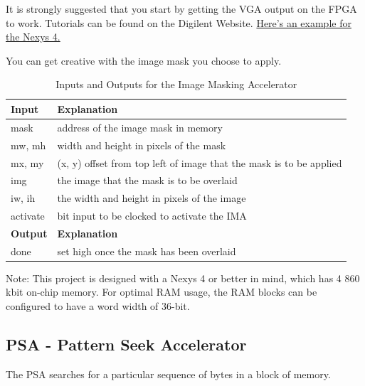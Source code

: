 It is strongly suggested that you start by getting the VGA output on the FPGA to work. Tutorials can be found on the Digilent Website. \href{https://reference.digilentinc.com/learn/programmable-logic/tutorials/nexys-4-vga-test-pattern-with-mouse-overlay/start}{Here's an example for the Nexys 4.} 

You can get creative with the image mask you choose to apply.

\begin{table}[H]
\centering
\caption{Inputs and Outputs for the Image Masking Accelerator}
\label{tbl:IMAIO}
\begin{tabular}{ll}
\textbf{Input} & \textbf{Explanation} \\ \hline
\multicolumn{1}{|l|}{mask} & \multicolumn{1}{l|}{address of the image mask in memory} \\ \hline
\multicolumn{1}{|l|}{mw, mh} & \multicolumn{1}{l|}{width and height in pixels of the mask} \\ \hline
\multicolumn{1}{|l|}{mx, my} & \multicolumn{1}{l|}{(x, y) offset from top left of image that the mask is to be applied} \\ \hline
\multicolumn{1}{|l|}{img} & \multicolumn{1}{l|}{the image that the mask is to be overlaid} \\ \hline
\multicolumn{1}{|l|}{iw, ih} & \multicolumn{1}{l|}{the width and height in pixels of the image} \\ \hline
\multicolumn{1}{|l|}{activate} & \multicolumn{1}{l|}{bit input to be clocked to activate the IMA} \\ \hline
\textbf{Output} & \textbf{Explanation} \\ \hline
\multicolumn{1}{|l|}{done} & \multicolumn{1}{l|}{set high once the mask has been overlaid} \\ \hline
\end{tabular}
\end{table} 
Note: This project is designed with a Nexys 4 or better in mind, which has 4 860 kbit on-chip memory. For optimal RAM usage, the RAM blocks can be configured to have a word width of 36-bit.

\subsection{PSA - Pattern Seek Accelerator}
The PSA searches for a particular sequence of bytes in a block of memory.

